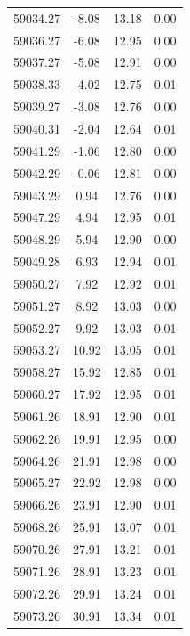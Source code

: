 \begin{longtable}{|c|c|c|c|}
 59034.27 &   -8.08 &       13.18 &          0.00 \\
 59036.27 &   -6.08 &       12.95 &          0.00 \\
 59037.27 &   -5.08 &       12.91 &          0.00 \\
 59038.33 &   -4.02 &       12.75 &          0.01 \\
 59039.27 &   -3.08 &       12.76 &          0.00 \\
 59040.31 &   -2.04 &       12.64 &          0.01 \\
 59041.29 &   -1.06 &       12.80 &          0.00 \\
 59042.29 &   -0.06 &       12.81 &          0.00 \\
 59043.29 &    0.94 &       12.76 &          0.00 \\
 59047.29 &    4.94 &       12.95 &          0.01 \\
 59048.29 &    5.94 &       12.90 &          0.00 \\
 59049.28 &    6.93 &       12.94 &          0.01 \\
 59050.27 &    7.92 &       12.92 &          0.01 \\
 59051.27 &    8.92 &       13.03 &          0.00 \\
 59052.27 &    9.92 &       13.03 &          0.01 \\
 59053.27 &   10.92 &       13.05 &          0.01 \\
 59058.27 &   15.92 &       12.85 &          0.01 \\
 59060.27 &   17.92 &       12.95 &          0.01 \\
 59061.26 &   18.91 &       12.90 &          0.01 \\
 59062.26 &   19.91 &       12.95 &          0.00 \\
 59064.26 &   21.91 &       12.98 &          0.00 \\
 59065.27 &   22.92 &       12.98 &          0.00 \\
 59066.26 &   23.91 &       12.90 &          0.01 \\
 59068.26 &   25.91 &       13.07 &          0.01 \\
 59070.26 &   27.91 &       13.21 &          0.01 \\
 59071.26 &   28.91 &       13.23 &          0.01 \\
 59072.26 &   29.91 &       13.24 &          0.01 \\
 59073.26 &   30.91 &       13.34 &          0.01 \\

\end{longtable}
